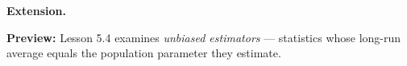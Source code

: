 \documentclass[10pt]{article}
\begin{document}
\begin{extensionbox}
\textbf{Extension.}
\end{extensionbox}

\begin{reflectionbox}
\textbf{Preview:} Lesson 5.4 examines \emph{unbiased estimators} --- statistics whose long-run average equals the population parameter they estimate.
\end{reflectionbox}
\end{document}

